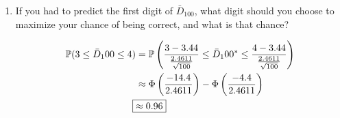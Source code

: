 \documentclass[titlepage, 12pt, leqno]{article}
\begin{document}
\begin{ex}
\begin{enumerate}
            \vspace{10px}

        \item If you had to predict the first digit of $ \bar D_{100}$, what 
            digit should you choose to maximize your chance of being correct, and
            what is that chance?

           \begin{align*}
               \mathbb{P}(3 \le \bar D_100 \le 4) &= \mathbb{P}\left(
                   \frac{3-3.44}{\frac{2.4611}{\sqrt{100}}} \le \bar D_100^* \le
                   \frac{4-3.44}{\frac{2.4611}{\sqrt{100}}}\right) \\
                                                  & \approx \Phi\left(
                                                      \frac{-14.4}{2.4611}\right)
                                                      - \Phi\left(\frac{-4.4}{
                                                      2.4611}\right) \\
                   \Aboxed{&\approx 0.96} 
           \end{align*}
    \end{enumerate}
\end{ex}
\end{document}
